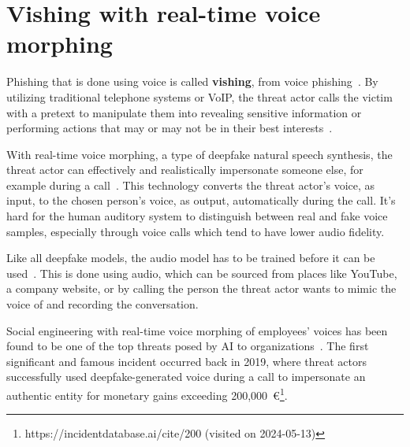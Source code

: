 \section{Vishing with real-time voice morphing}
\begin{comment}
\end{comment}

%
%
Phishing that is done using voice is called \textbf{vishing}, from voice phishing~\citep{doan_BTSE_Audio_Deepfake_Detection_2023}. By utilizing traditional telephone systems or VoIP, the threat actor calls the victim with a pretext to manipulate them into revealing sensitive information or performing actions that may or may not be in their best interests~\citep{hadnagy_Social_Engineering_The_Science_2018}.


%
%
With real-time voice morphing, a type of deepfake natural speech synthesis, the threat actor can effectively and realistically impersonate someone else, for example during a call~\citep{doan_BTSE_Audio_Deepfake_Detection_2023}. This technology converts the threat actor's voice, as input, to the chosen person's voice, as output, automatically during the call. It's hard for the human auditory system to distinguish between real and fake voice samples, especially through voice calls which tend to have lower audio fidelity.



%
%
Like all deepfake models, the audio model has to be trained before it can be used~\citep{doan_BTSE_Audio_Deepfake_Detection_2023}. This is done using audio, which can be sourced from places like YouTube, a company website, or by calling the person the threat actor wants to mimic the voice of and recording the conversation.



%
%
Social engineering with real-time voice morphing of employees' voices has been found to be one of the top threats posed by AI to organizations~\citep{mirsky_Threat_Offensive_AI_Organizations_2023}. The first significant and famous incident occurred back in 2019, where threat actors successfully used deepfake-generated voice during a call to impersonate an authentic entity for monetary gains exceeding 200,000~€\footnote{https://incidentdatabase.ai/cite/200 (visited on 2024-05-13)}.

